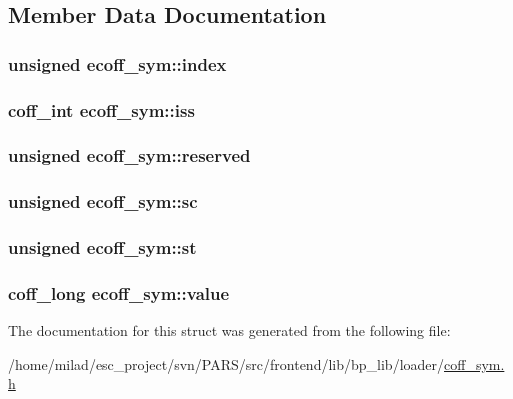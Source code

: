 \subsection{Member Data Documentation}
\hypertarget{structecoff__sym_aec47fca2d8f69799980da61d442414f0}{
\subsubsection[{index}]{\setlength{\rightskip}{0pt plus 5cm}unsigned {\bf ecoff\_\-sym::index}}}
\label{structecoff__sym_aec47fca2d8f69799980da61d442414f0}
\hypertarget{structecoff__sym_a84e2f0ffef18d414f63742dc0f7c34bf}{
\subsubsection[{iss}]{\setlength{\rightskip}{0pt plus 5cm}coff\_\-int {\bf ecoff\_\-sym::iss}}}
\label{structecoff__sym_a84e2f0ffef18d414f63742dc0f7c34bf}
\hypertarget{structecoff__sym_a1e46d0ed7bc76ecc0faf584d88d0ab74}{
\subsubsection[{reserved}]{\setlength{\rightskip}{0pt plus 5cm}unsigned {\bf ecoff\_\-sym::reserved}}}
\label{structecoff__sym_a1e46d0ed7bc76ecc0faf584d88d0ab74}
\hypertarget{structecoff__sym_ac665cb20549d0a79d2c7bd5e0d659e41}{
\subsubsection[{sc}]{\setlength{\rightskip}{0pt plus 5cm}unsigned {\bf ecoff\_\-sym::sc}}}
\label{structecoff__sym_ac665cb20549d0a79d2c7bd5e0d659e41}
\hypertarget{structecoff__sym_a0ff7a57359cca8c3b5cb1ce1562c8fb5}{
\subsubsection[{st}]{\setlength{\rightskip}{0pt plus 5cm}unsigned {\bf ecoff\_\-sym::st}}}
\label{structecoff__sym_a0ff7a57359cca8c3b5cb1ce1562c8fb5}
\hypertarget{structecoff__sym_a29ad6f5c1882fa45e38611590fc39b86}{
\subsubsection[{value}]{\setlength{\rightskip}{0pt plus 5cm}coff\_\-long {\bf ecoff\_\-sym::value}}}
\label{structecoff__sym_a29ad6f5c1882fa45e38611590fc39b86}


The documentation for this struct was generated from the following file:\begin{DoxyCompactItemize}
\item 
/home/milad/esc\_\-project/svn/PARS/src/frontend/lib/bp\_\-lib/loader/\hyperlink{coff__sym_8h}{coff\_\-sym.h}\end{DoxyCompactItemize}
